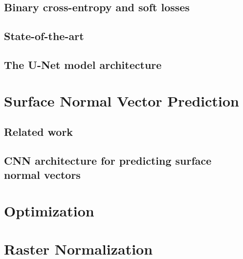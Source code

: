 \subsection{Binary cross-entropy and soft losses}

\subsection{State-of-the-art}%
\label{sec:segmentation-state-of-the-art}

\subsection{The U-Net model architecture}%
\label{sec:unet}

\clearpage

\section{Surface Normal Vector Prediction}\label{sec:surface-raster-model}

\subsection{Related work}\label{sec:normal-vector-literature}

\subsection{CNN architecture for predicting surface normal vectors}%
\label{sec:normal-model}

\section{Optimization}\label{sec:optimization}


\section{Raster Normalization}%
\label{sec:raster-normalization}

